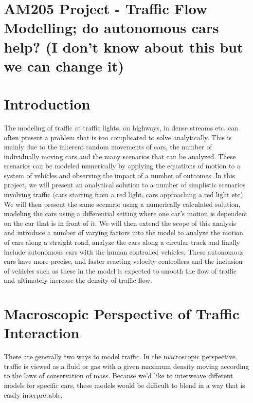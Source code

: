 \documentclass[11pt]{article}
\begin{document}
\lstset{language=Python, basicstyle=\scriptsize} %

\section*{AM205 Project - Traffic Flow Modelling; do autonomous cars help? (I don't know about this but we can change it)}

\section{Introduction}
\paragraph{}The modeling of traffic at traffic lights, on highways, in dense streams etc. can often present a problem that is too complicated to solve analytically. This is mainly due to the inherent random movements of cars, the number of individually moving cars and the many scenarios that can be analyzed. These scenarios can be modeled numerically by applying the equations of motion to a system of vehicles and observing the impact of a number of outcomes. In this project, we will present an analytical solution to a number of simplistic scenarios involving traffic (cars starting from a red light, cars approaching a red light etc). We will then present the same scenario using a numerically calculated solution, modeling the cars using a differential setting where one car's motion is dependent on the car that is in front of it. We will then extend the scope of this analysis and introduce a number of varying factors into the model to analyze the motion of cars along a straight road, analyze the cars along a circular track and finally include autonomous cars with the human controlled vehicles. These autonomous cars have more precise, and faster reacting velocity controllers and the inclusion of vehicles such as these in the model is expected to smooth the flow of traffic and ultimately increase the density of traffic flow.

\section{Macroscopic Perspective of Traffic Interaction}
\paragraph{}There are generally two ways to model traffic. In the macroscopic perspective, traffic is viewed as a fluid or gas with a given maximum density moving according to the laws of conservation of mass. Because we'd like to interweave different models for specific cars, these models would be difficult to blend in a way that is easily interpretable. 
\end{document}
